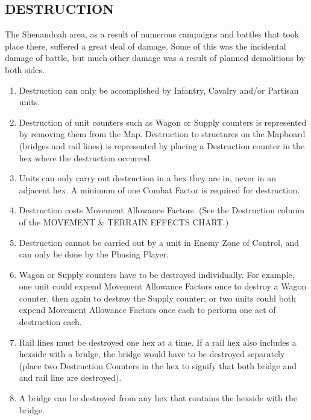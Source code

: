 \subsection{DESTRUCTION}

The Shenandoah area, as a result of numerous campaigns and battles that took place there, suffered a great deal of damage. Some of this was the incidental damage of battle, but much other damage was a result of planned demolitions by both sides.

\begin{enumerate}
  \item Destruction can only be accomplished by Infantry, Cavalry and/or Partisan units.

  \item Destruction of unit counters such as Wagon or Supply counters is represented by removing them from the Map. Destruction to structures on the Mapboard (bridges and rail lines) is represented by placing a Destruction counter in the hex where the destruction occurred.

  \item Units can only carry out destruction in a hex they are in, never in an adjacent hex. A minimum of one Combat Factor is required for destruction.

  \item Destruction costs Movement Allowance Factors. (See the Destruction column of the MOVEMENT \& TERRAIN EFFECTS CHART.)

  \item Destruction cannot be carried out by a unit in Enemy Zone of Control, and can only be done by the Phasing Player.

  \item Wagon or Supply counters have to be destroyed individually. For example, one unit could expend Movement Allowance Factors once to destroy a Wagon counter, then again to destroy the Supply counter; or two units could both expend Movement Allowance Factors once each to perform one act of destruction each.

  \item Rail lines must be destroyed one hex at a time. If a rail hex also includes a hexside with a bridge, the bridge would have to be destroyed separately (place two Destruction Counters in the hex to signify that both bridge and and rail line are destroyed).

  \item A bridge can be destroyed from any hex that contains the hexside with the bridge.
\end{enumerate}

